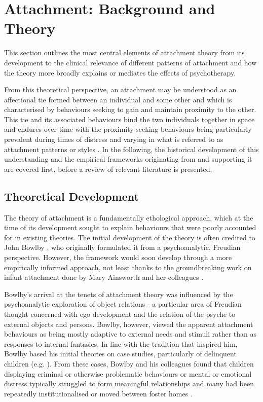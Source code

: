 \documentclass[12pt]{report}
\begin{document}
\chapter{Attachment: Background and Theory}
This section outlines the most central elements of attachment theory from its development to the clinical relevance of different patterns of attachment and how the theory more broadly explains or mediates the effects of psychotherapy.

From this theoretical perspective, an attachment may be understood as an affectional tie formed between an individual and some other and which is characterised by behaviours seeking to gain and maintain proximity to the other.
This tie and its associated behaviours bind the two individuals together in space and endures over time with the proximity-seeking behaviours being particularly prevalent during times of distress and varying in what is referred to as attachment patterns or styles \cite{Ainsworth1970,Bowlby1988}.
In the following, the historical development of this understanding and the empirical frameworks originating from and supporting it are covered first, before a review of relevant literature is presented.

\section{Theoretical Development}
The theory of attachment is a fundamentally ethological approach, which at the time of its development sought to explain behaviours that were poorly accounted for in existing theories.
The initial development of the theory is often credited to John Bowlby \cite{Bowlby1969attachment,Bowlby1973separation,Bowlby1980loss}, who originally formulated it from a psychoanalytic, Freudian perspective.
However, the framework would soon develop through a more empirically informed approach, not least thanks to the groundbreaking work on infant attachment done by Mary Ainsworth and her colleagues \cite{Ainsworth1970}.

Bowlby's arrival at the tenets of attachment theory was influenced by the psychoanalytic exploration of object relations - a particular area of Freudian thought concerned with ego development and the relation of the psyche to external objects and persons.
Bowlby, however, viewed the apparent attachment behaviours as being mostly adaptive to external needs and stimuli rather than as responses to internal fantasies. In line with the tradition that inspired him, Bowlby based his initial theories on case studies, particularly of delinquent children (e.g. \cite{bowlby1946thieves}). From these cases, Bowlby and his colleagues found that children displaying criminal or otherwise problematic behaviours or mental or emotional distress typically struggled to form meaningful relationships and many had been repeatedly institutionalised or moved between foster homes \cite{bowlby1951WHO}.
\end{document}
